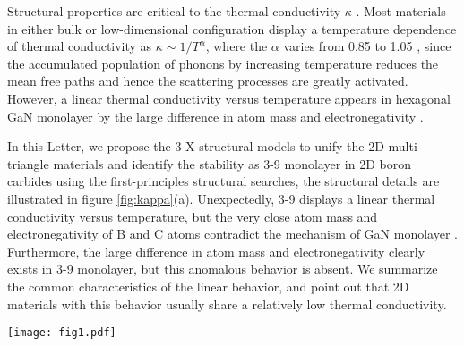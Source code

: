 \documentclass[journal=jpclcd,manuscript=article, layout=twocolumn]{achemso}
\begin{document}
	Structural properties are critical to the thermal conductivity $\kappa$  \cite{2018-nanoscale-DDI,2017-PRB-graphene-mass,2019-nanoscale-reflection,2018-JPCL-optical,2019-JPCL-CrTiCT,2020-PRL-temp-indepent,2021-JPCL-highZT}. Most materials in either bulk or low-dimensional configuration display a temperature dependence of thermal conductivity as $\kappa\sim1/T^{\alpha}$, where the $\alpha$ varies from 0.85 to 1.05 \cite{2021-PRL-K-TaN,2017-JPCL-2D84,2021-JPCL-deng,2020-JPCL-chenxin}, since the accumulated population of phonons by increasing temperature reduces the mean free paths and hence the scattering processes are greatly activated. However, a linear thermal conductivity versus temperature appears in hexagonal GaN monolayer by the large difference in atom mass and electronegativity \cite{2017-PRB-GaN,2018-JPCL-penta}.
	
	In this Letter, we propose the 3-X structural models to unify the 2D multi-triangle materials and identify the stability as 3-9  monolayer in 2D boron carbides using the first-principles structural searches, the structural details are illustrated in figure \ref{fig:kappa}(a). Unexpectedly, 3-9  displays a linear thermal conductivity versus temperature, but the very close atom mass and electronegativity of B and C atoms contradict the mechanism of GaN monolayer \cite{2017-PRB-GaN}. Furthermore, the large difference in atom mass and electronegativity clearly exists in 3-9  monolayer, but this anomalous behavior is absent. We summarize the common characteristics of the linear behavior, and point out that 2D materials with this behavior usually share a relatively low thermal conductivity. 
	
		\begin{figure*}[htbp]
		\centering
		\texttt{[image: fig1.pdf]}
		\caption{(a) 3-9  configuration, where carbon triangles are alternately arranged in hexagonal lattice, together with the electron localization functions. (b) Temperature dependent thermal conductivity in 3-9  and  monolayers. The absolute and percentage (inset panels) contributions from the phonon branches in (c) 3-9  and (d)  monolayers.}
		\label{fig:kappa}
	    \end{figure*}
	
\end{document}
